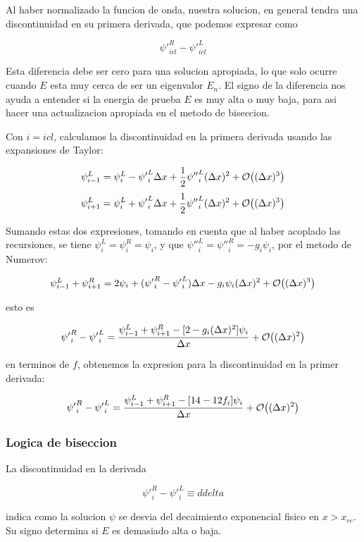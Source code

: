 \documentclass[11pt]{article}
\begin{document}
Al haber normalizado la funcion de onda, nuestra solucion, en general tendra una discontinuidad en su primera derivada, que podemos expresar como

\[ {\psi'}_{icl}^{R} - {\psi'}_{icl}^{L} \]

Esta diferencia debe ser cero para una solucion apropiada, lo que solo ocurre cuando \(E\) esta muy cerca de ser un eigenvalor \(E_n\). El signo de la diferencia nos ayuda a entender si la energia de prueba \(E\) es muy alta o muy baja, para asi hacer una actualizacion apropiada en el metodo de biseccion.

Con \(i = icl\), calculamos la discontinuidad en la primera derivada usando las expansiones de Taylor:

\[ \psi_{i-1}^L = \psi_i^L - {\psi'}_i^L \Delta x + \frac{1}{2}{\psi''}_i^L (\Delta x)^2 + \order{(\Delta x)^3} \]
\[ \psi_{i+1}^L = \psi_i^L + {\psi'}_i^L \Delta x + \frac{1}{2}{\psi''}_i^L (\Delta x)^2 + \order{(\Delta x)^3} \]

Sumando estas dos expresiones, tomando en cuenta que al haber acoplado las recursiones, se tiene \(\psi_i^L = \psi_i^R = \psi_i\), y que \({\psi''}_i^L = {\psi''}_i^{R} = -g_i\psi_i\), por el metodo de Numerov:

\[ \psi^L_{i-1} + \psi^R_{i+1} = 2\psi_i + ({\psi'}_i^R - {\psi'}_i^L)\Delta x - g_i\psi_i(\Delta x)^2 + \order{(\Delta x)^3} \]

esto es

\[ {\psi'}_i^R - {\psi'}_i^L = \frac{\psi_{i-1}^L + \psi_{i+1}^R - [2-g_i(\Delta x)^2]\psi_i}{\Delta x} + \order{(\Delta x)^2} \]

en terminos de \(f\), obtenemos la expresion para la discontinuidad en la primer derivada:

\[ {\psi'}_i^R - {\psi'}_i^L = \frac{\psi_{i-1}^L + \psi_{i+1}^R - [14-12f_i]\psi_i}{\Delta x} + \order{(\Delta x)^2} \]
\subsubsection{Logica de biseccion}
\label{sec:org53bf1f3}

La discontinuidad en la derivada

\[ {\psi'}_i^R - {\psi'}_i^L \equiv ddelta  \]

indica como la solucion \(\psi\) se desvia del decaimiento exponencial fisico en \(x>x_{rc}\). Su signo determina si \(E\) es demasiado alta o baja.
\end{document}
